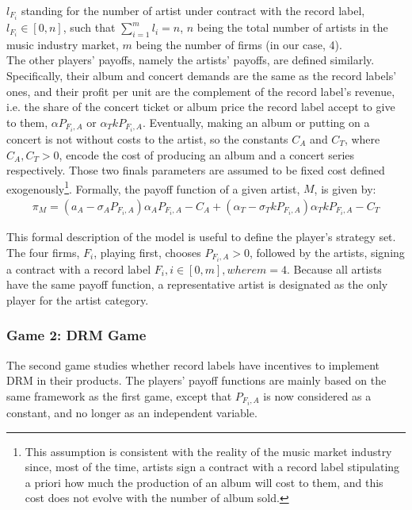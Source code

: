 \documentclass[a4paper,12pt]{article}
\numberwithin{equation}{section}
\begin{document}
$l_{F_i}$ standing for the number of artist under contract with the record label, $l_{F_i} \in [0, n]$, such that $\sum_{i = 1}^m l_i = n$, $n$ being the total number of artists in the music industry market, $m$ being the number of firms (in our case, 4).\\

The other players’ payoffs, namely the artists’ payoffs, are defined similarly. Specifically, their album and concert demands are the same as the record labels’ ones, and their profit per unit are the complement of the record label’s revenue, i.e. the share of the concert ticket or album price the record label accept to give to them, $\alpha P_{F_i, A}$ or $\alpha_T k P_{F_i, A}$. Eventually, making an album or putting on a concert is not without costs to the artist, so the constants $C_A$ and $C_T$, where $C_A, C_T > 0$,  encode the cost of producing an album and a concert series respectively. Those two finals parameters are assumed to be fixed cost defined exogenously\footnote{
This assumption is consistent with the reality of the music market industry since, most of the time, artists sign a contract with a record label stipulating a priori how much the production of an album will cost to them, and this cost does not evolve with the number of album sold.
}. Formally, the payoff function of a given artist, $M$, is given by:
\begin{eqnarray}
\pi_M = (a_A - \sigma_A P_{F_i, A})\alpha_A P_{F_i, A} - C_A
	+ (\alpha_T - \sigma_T k P_{F_i, A}) \alpha_T k P_{F_i, A} - C_T
\end{eqnarray}

This formal description of the model is useful to define the player’s strategy set. The four firms, $F_i$, playing first, chooses $P_{F_i, A} > 0$, followed by the artists, signing a contract with a record label $F_i, i \in [0, m], where m = 4$. Because all artists have the same payoff function, a representative artist is designated as the only player for the artist category. 

\subsubsection{Game 2: DRM Game}

The second game studies whether record labels have incentives to implement DRM in their products. The players’ payoff functions are mainly based on the same framework as the first game, except that $P_{F_i, A}$ is now considered as a constant, and no longer as an independent variable.\\
\end{document}
